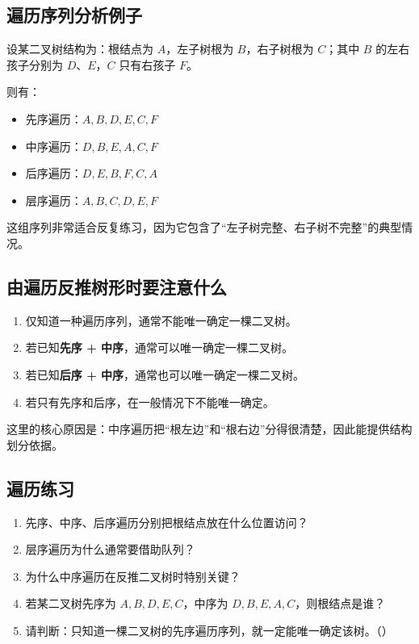 \documentclass{../../note}
\begin{document}
\subsection{遍历序列分析例子}

设某二叉树结构为：根结点为 $A$，左子树根为 $B$，右子树根为 $C$；其中 $B$ 的左右孩子分别为 $D$、$E$，$C$ 只有右孩子 $F$。

则有：

\begin{itemize}
  \item 先序遍历：$A, B, D, E, C, F$
  \item 中序遍历：$D, B, E, A, C, F$
  \item 后序遍历：$D, E, B, F, C, A$
  \item 层序遍历：$A, B, C, D, E, F$
\end{itemize}

这组序列非常适合反复练习，因为它包含了“左子树完整、右子树不完整”的典型情况。

\subsection{由遍历反推树形时要注意什么}

\begin{enumerate}
  \item 仅知道一种遍历序列，通常不能唯一确定一棵二叉树。
  \item 若已知\textbf{先序 + 中序}，通常可以唯一确定一棵二叉树。
  \item 若已知\textbf{后序 + 中序}，通常也可以唯一确定一棵二叉树。
  \item 若只有先序和后序，在一般情况下不能唯一确定。
\end{enumerate}

这里的核心原因是：中序遍历把“根左边”和“根右边”分得很清楚，因此能提供结构划分依据。

\subsection{遍历练习}

\begin{enumerate}
  \item 先序、中序、后序遍历分别把根结点放在什么位置访问？
  \item 层序遍历为什么通常要借助队列？
  \item 为什么中序遍历在反推二叉树时特别关键？
  \item 若某二叉树先序为 $A,B,D,E,C$，中序为 $D,B,E,A,C$，则根结点是谁？
  \item 请判断：只知道一棵二叉树的先序遍历序列，就一定能唯一确定该树。（\hspace{1cm}）
\end{enumerate}
\end{document}
